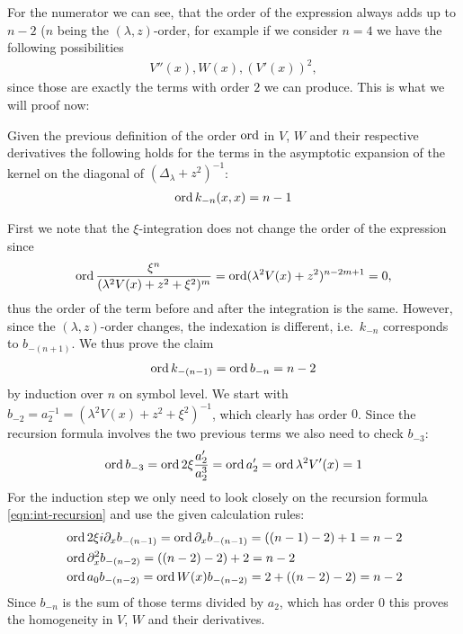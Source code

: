 For the numerator we can see, that the order of the expression always adds up to
$n-2$ ($n$ being the $(\lambda,z)$-order, for example if we consider $n=4$ we
have the following possibilities
\begin{align*}
  V''(x), W(x), (V'(x))^2,
\end{align*}
since those are exactly the terms with order $2$ we can produce. This is what we
will proof now:
\begin{Theorem}
  Given the previous definition of the order $\operatorname{ord}$ in $V$, $W$ and their
  respective derivatives the following holds for the terms in the asymptotic
  expansion of the kernel on the diagonal of $(\Delta_\lambda + z^2)^{-1}$:
  \begin{align}
    \operatorname{ord} k_{-n}(x, x) = n - 1
  \end{align}
  \begin{Proof}
    First we note that the $\xi$-integration does not change the order of the
    expression since
    \begin{align*}
      \operatorname{ord} \frac{\xi^n}{(\lambda^2 V(x) + z^2 + \xi^2)^m} = \operatorname{ord} (\lambda^2 V(x)
      + z^2)^{n-2m+1} = 0,
    \end{align*}
    thus the order of the term before and after the integration is the same.
    However, since the $(\lambda,z)$-order changes, the indexation is different,
    i.e.\ $k_{-n}$ corresponds to $b_{-(n+1)}$. We
    thus prove the claim
    \begin{align*}
      \operatorname{ord} k_{-(n-1)} = \operatorname{ord} b_{-n} = n - 2
    \end{align*}
    by induction over $n$ on symbol level. We start with $b_{-2} = a_2^{-1} =
    (\lambda^2 V(x) + z^2 + \xi^2)^{-1}$, which clearly has order $0$. Since the
    recursion formula involves the two previous terms we also need to check
    $b_{-3}$:
    \begin{align*}
      \operatorname{ord} b_{-3} = \operatorname{ord} 2\xi \frac{a_2'}{a_2^3} = \operatorname{ord} a_2' = \operatorname{ord} \lambda^2
      V'(x) = 1
    \end{align*}
    For the induction step we only need to look closely on the recursion formula
    \eqref{eqn:int-recursion} and use the given calculation rules:
    \begin{align*}
      &\operatorname{ord} 2\xi i \partial_x b_{-(n-1)} = \operatorname{ord} \partial_x b_{-(n-1)} = ((n-1) - 2) +
      1 = n - 2\\
      &\operatorname{ord} \partial_x^2 b_{-(n-2)} = ((n - 2) - 2) + 2 = n - 2 \\
      &\operatorname{ord} a_0 b_{-(n-2)} = \operatorname{ord} W(x) b_{-(n-2)} = 2 + ((n-2) - 2) = n - 2
    \end{align*}
    Since $b_{-n}$ is the sum of those terms divided by $a_2$, which has order
    $0$ this proves the homogeneity in $V$, $W$ and their derivatives.
  \end{Proof}
\end{Theorem}
